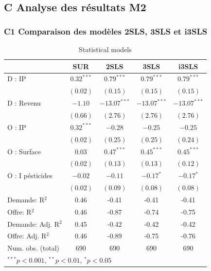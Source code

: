 \documentclass[11pt,]{article}
\begin{document}
\hypertarget{c-analyse-des-resultats-m2}{%
\subsection{C Analyse des résultats
M2}\label{c-analyse-des-resultats-m2}}

\hypertarget{c1-comparaison-des-modeles-2sls-3sls-et-i3sls}{%
\subsubsection{C1 Comparaison des modèles 2SLS, 3SLS et
i3SLS}\label{c1-comparaison-des-modeles-2sls-3sls-et-i3sls}}

\FloatBarrier

\begin{table}[!htbp]
\begin{center}
\begin{tabular}{l c c c c }
\hline
 & SUR & 2SLS & 3SLS & i3SLS \\
\hline
D : IP              & $0.32^{***}$ & $0.79^{***}$   & $0.79^{***}$   & $0.79^{***}$   \\
                    & $(0.02)$     & $(0.15)$       & $(0.15)$       & $(0.15)$       \\
D : Revenu          & $-1.10$      & $-13.07^{***}$ & $-13.07^{***}$ & $-13.07^{***}$ \\
                    & $(0.66)$     & $(2.76)$       & $(2.76)$       & $(2.76)$       \\
O : IP              & $0.32^{***}$ & $-0.28$        & $-0.25$        & $-0.25$        \\
                    & $(0.02)$     & $(0.25)$       & $(0.25)$       & $(0.24)$       \\
O : Surface         & $0.03$       & $0.47^{***}$   & $0.45^{***}$   & $0.45^{***}$   \\
                    & $(0.02)$     & $(0.13)$       & $(0.13)$       & $(0.12)$       \\
O : I pésticides    & $-0.02$      & $-0.11$        & $-0.17^{*}$    & $-0.17^{*}$    \\
                    & $(0.02)$     & $(0.09)$       & $(0.08)$       & $(0.08)$       \\
\hline
Demande: R$^2$      & 0.46         & -0.41          & -0.41          & -0.41          \\
Offre: R$^2$        & 0.46         & -0.87          & -0.74          & -0.75          \\
Demande: Adj. R$^2$ & 0.45         & -0.42          & -0.42          & -0.42          \\
Offre: Adj. R$^2$   & 0.46         & -0.89          & -0.75          & -0.76          \\
Num. obs. (total)   & 690          & 690            & 690            & 690            \\
\hline
\multicolumn{5}{l}{\scriptsize{$^{***}p<0.001$, $^{**}p<0.01$, $^*p<0.05$}}
\end{tabular}
\caption{Statistical models}
\label{table : sur, 2sls, 3sls and fiml}
\end{center}
\end{table}
\end{document}
